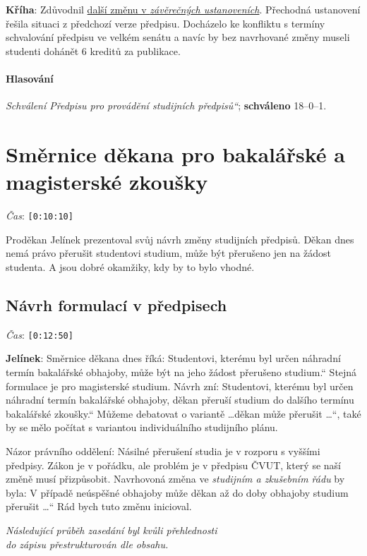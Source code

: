 \documentclass[a4paper,10pt,notitlepage]{article}
\newcommand{\ts}[1]{\texttt{[#1]}}
\newcommand{\tsp}[1]{\noindent \textit{Čas}: \ts{#1}}
\newcommand{\cl}[1]{\noindent \textbf{#1}:}
\newcommand{\hl}[3]{\paragraph{Hlasování} \textit{#1}; \textbf{#3} #2.}
\newcommand{\pozn}[1]{\begin{center}\textit{#1}\end{center}}
\newcommand{\tourl}[1]{http://www.fel.cvut.cz/senat/zapisy/#1}
\newcommand\uv[1]{\quotedblbase #1\textquotedblleft}%
\begin{document}
\cl{Kříha} Zdůvodnil \href{\tourl{zapis12-predpis-stud-delta36.doc}}{další změnu v \textit{závěrečných ustanoveních}}. Přechodná ustanovení řešila situaci z předchozí verze předpisu. Docházelo ke konfliktu s termíny schvalování předpisu ve velkém senátu a navíc by bez navrhované změny museli studenti dohánět 6 kreditů za publikace.

\hl{Schválení \uv{Předpisu pro provádění studijních předpisů}}{18--0--1}{schváleno}


\section{Směrnice děkana pro bakalářské a magisterské zkoušky}

\tsp{0:10:10}

Proděkan Jelínek prezentoval svůj návrh změny studijních předpisů.  Děkan dnes nemá právo přerušit studentovi studium, může být přerušeno jen na žádost studenta. A jsou dobré okamžiky, kdy by to bylo vhodné.

\subsection{Návrh formulací v předpisech}

\tsp{0:12:50}

\cl{Jelínek} Směrnice děkana dnes říká: \uv{Studentovi, kterému byl určen náhradní termín bakalářské obhajoby, může být na jeho žádost přerušeno studium.} Stejná formulace je pro magisterské studium. Návrh zní: \uv{Studentovi, kterému byl určen náhradní termín bakalářské obhajoby, děkan přeruší studium do dalšího termínu bakalářské zkoušky.} Můžeme debatovat o variantě \uv{\dots děkan může přerušit \dots}, také by se mělo počítat s variantou individuálního studijního plánu.

Názor právního oddělení: Násilné přerušení studia je v rozporu s vyššími předpisy. Zákon je v pořádku, ale problém je v předpisu ČVUT, který se naší změně musí přizpůsobit. Navrhovoná změna ve \textit{studijním a zkušebním řádu} by byla: \uv{V případě neúspěšné obhajoby může děkan až do doby obhajoby studium přerušit \dots} Rád bych tuto změnu inicioval.
  
\pozn{Následující průběh zasedání byl kvůli přehlednosti\\do zápisu přestrukturován dle obsahu.}
\end{document}
